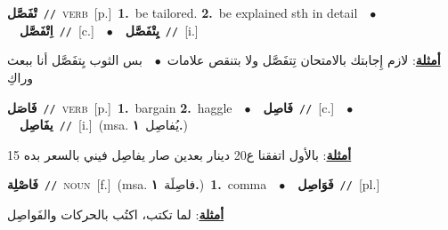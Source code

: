 \documentclass[10pt,a4paper,twoside]{article} %
\begin{document}
\begin{multicols}{2}
{\setlength\topsep{0pt}\textbf{\foreignlanguage{arabic}{تْفَصَّل}}\ {\color{gray}\texttt{//}\color{black}}\ \textsc{verb}\ [p.]\ \textbf{1.}~be tailored.  \textbf{2.}~be explained sth in detail\ \ $\bullet$\ \ \setlength\topsep{0pt}\textbf{\foreignlanguage{arabic}{اِتْفَصَّل}}\ {\color{gray}\texttt{//}\color{black}}\ [c.]\ \ $\bullet$\ \ \setlength\topsep{0pt}\textbf{\foreignlanguage{arabic}{يِتْفَصَّل}}\ {\color{gray}\texttt{//}\color{black}}\ [i.]\  \begin{flushright}\color{gray}\foreignlanguage{arabic}{\textbf{\underline{\foreignlanguage{arabic}{أمثلة}}}: لازم إِجابتك بالامتحان تِتفَصَّل ولا بتنقص علامات\ $\bullet$\ \  بس الثوب يِتفَصَّل أنا ببعث وراكِ}\end{flushright}\color{black}} \vspace{2mm}

{\setlength\topsep{0pt}\textbf{\foreignlanguage{arabic}{فَاصَل}}\ {\color{gray}\texttt{//}\color{black}}\ \textsc{verb}\ [p.]\ \textbf{1.}~bargain  \textbf{2.}~haggle\ \ $\bullet$\ \ \setlength\topsep{0pt}\textbf{\foreignlanguage{arabic}{فَاصِل}}\ {\color{gray}\texttt{//}\color{black}}\ [c.]\ \ $\bullet$\ \ \setlength\topsep{0pt}\textbf{\foreignlanguage{arabic}{يفَاصِل}}\ {\color{gray}\texttt{//}\color{black}}\ [i.]\ \color{gray}(msa. \foreignlanguage{arabic}{يُفاصِل}~\foreignlanguage{arabic}{\textbf{١.}})\color{black}\  \begin{flushright}\color{gray}\foreignlanguage{arabic}{\textbf{\underline{\foreignlanguage{arabic}{أمثلة}}}: بالأول اتفقنا ع20 دينار بعدين صار يفاصِل فيني بالسعر بده 15}\end{flushright}\color{black}} \vspace{2mm}

{\setlength\topsep{0pt}\textbf{\foreignlanguage{arabic}{فَاصْلِة}}\ {\color{gray}\texttt{//}\color{black}}\ \textsc{noun}\ [f.]\ \color{gray}(msa. \foreignlanguage{arabic}{فاصِلَة}~\foreignlanguage{arabic}{\textbf{١.}})\color{black}\ \textbf{1.}~comma\ \ $\bullet$\ \ \setlength\topsep{0pt}\textbf{\foreignlanguage{arabic}{فَوَاصِل}}\ {\color{gray}\texttt{//}\color{black}}\ [pl.]\  \begin{flushright}\color{gray}\foreignlanguage{arabic}{\textbf{\underline{\foreignlanguage{arabic}{أمثلة}}}: لما تكتب، اكتُب بالحركات والفَواصِل}\end{flushright}\color{black}} \vspace{2mm}


\end{multicols}
\end{document}
